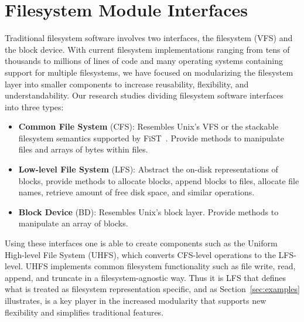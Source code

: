 \section{Filesystem Module Interfaces}
\label{sec:interfaces}

Traditional filesystem software involves two interfaces, the
filesystem (VFS) and the block device. With current filesystem
implementations ranging from tens of thousands to millions of lines of
code and many operating systems containing support for multiple
filesystems, we have focused on modularizing the filesystem layer into
smaller components to increase reusability, flexibility, and
understandability. Our research studies dividing filesystem software
interfaces into three types:

\begin{itemize}
\item \itemvspace{} {\bf Common File System} (CFS): Resembles Unix's
  VFS or the stackable filesystem semantics supported by
  FiST~\cite{zadok00fist}. Provide methods to manipulate files and
  arrays of bytes within files.
\item \itemvspace{} {\bf Low-level File System} (LFS): Abstract the
  on-disk representations of blocks, provide methods to allocate
  blocks, append blocks to files, allocate file names, retrieve amount
  of free disk space, and similar operations.
\item \itemvspace{} {\bf Block Device} (BD): Resembles Unix's block
  layer. Provide methods to manipulate an array of blocks.
\end{itemize}
\postlistspacing{}

Using these interfaces one is able to create components such as the
Uniform High-level File System (UHFS), which converts CFS-level
operations to the LFS-level. UHFS implements common filesystem
functionality such as file write, read, append, and truncate in a
filesystem-agnostic way. Thus it is LFS that defines what is treated
as filesystem representation specific, and as
Section~\ref{sec:examples} illustrates, is a key player in the
increased modularity that supports new flexibility and simplifies
traditional features.
